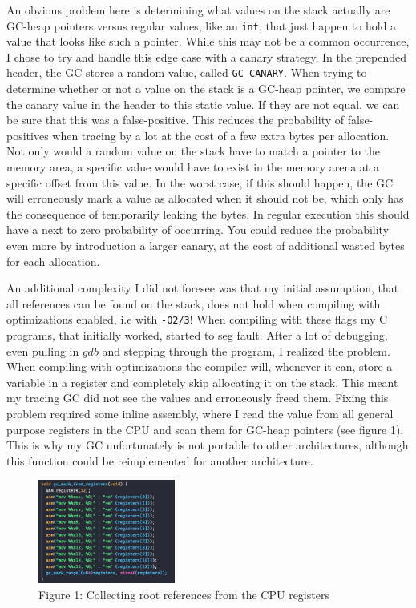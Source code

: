 An obvious problem here is determining what values on the stack actually are GC-heap pointers versus regular values, like an \texttt{int}, that just happen to hold a value that looks like such a pointer. While this may not be a common occurrence, I chose to try and handle this edge case with a canary strategy. In the prepended header, the GC stores a random value, called \texttt{GC\_CANARY}. When trying to determine whether or not a value on the stack is a GC-heap pointer, we compare the canary value in the header to this static value. If they are not equal, we can be sure that this was a false-positive. This reduces the probability of false-positives when tracing by a lot at the cost of a few extra bytes per allocation. Not only would a random value on the stack have to match a pointer to the memory area, a specific value would have to exist in the memory arena at a specific offset from this value. In the worst case, if this should happen, the GC will erroneously mark a value as allocated when it should not be, which only has the consequence of temporarily leaking the bytes. In regular execution this should have a next to zero probability of occurring. You could reduce the probability even more by introduction a larger canary, at the cost of additional wasted bytes for each allocation.

An additional complexity I did not foresee was that my initial assumption, that all references can be found on the stack, does not hold when compiling with optimizations enabled, i.e with \texttt{-O2/3}! When compiling with these flags my C programs, that initially worked, started to seg fault. After a lot of debugging, even pulling in $gdb$ and stepping through the program, I realized the problem. When compiling with optimizations the compiler will, whenever it can, store a variable in a register and completely skip allocating it on the stack. This meant my tracing GC did not see the values and erroneously freed them. Fixing this problem required some inline assembly, where I read the value from all general purpose registers in the CPU and scan them for GC-heap pointers (see figure 1). This is why my GC unfortunately is not portable to other architectures, although this function could be reimplemented for another architecture.

\begin{figure}[H]
    \centering
    \includegraphics[width=0.40\textwidth]{imgs/gc-inline-asm.png}
    {\\ \scriptsize Figure 1: Collecting root references from the CPU registers}
\end{figure}

